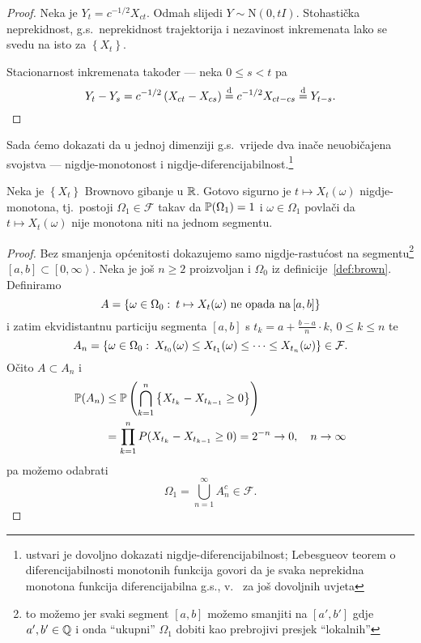 \documentclass[main.tex]{subfiles}
\begin{document}
\begin{proof}
	Neka je \( Y_t = c^{-1/2}X_{ct} \). Odmah slijedi \( Y \sim \mathrm N(0, tI) \). Stohastička neprekidnost, g.s.\ neprekidnost trajektorija i nezavinost
	inkremenata lako se svedu na isto za \( \left\{ X_t \right\} \).

	Stacionarnost inkremenata također --- neka \( 0 \le s < t \) pa \[ Y_t - Y_s = c^{-1/2}\left( X_{ct} - X_{cs} \right) \jpod c^{-1/2}X_{ct-cs} \jpod Y_{t-s}. \]
\end{proof}

Sada ćemo dokazati da u jednoj dimenziji g.s.\ vrijede dva inače neuobičajena svojstva --- nigdje-monotonost i nigdje-diferencijabilnost.\footnote{ustvari je dovoljno dokazati nigdje-diferencijabilnost;
	Lebesgueov teorem o diferencijabilnosti monotonih funkcija govori da je svaka neprekidna monotona funkcija diferencijabilna g.s., v.~\cite[remark~5.10]{sato} za još dovoljnih uvjeta}

\begin{teorem} \label{tm:brown-nemonotonost}
	Neka je \( \left\{ X_t \right\} \) Brownovo gibanje u \( \R \). Gotovo sigurno je \( t \mapsto X_t(\omega) \) nigdje-monotona, tj.\
	postoji \( \Omega_1 \in \mathcal F \) takav da \( \P(\Omega_1)=1 \) i \( \omega \in \Omega_1 \) povlači da \( t \mapsto X_t(\omega) \)
	nije monotona niti na jednom segmentu.
\end{teorem}

\begin{proof}
	Bez smanjenja općenitosti dokazujemo samo nigdje-rastućost na segmentu\footnote{to možemo jer svaki segment \( \left[ a,b \right] \) možemo smanjiti na \( \left[ a',b' \right] \) gdje \( a',b'\in\Q \) i onda \enquote{ukupni} \( \Omega_1 \) dobiti kao prebrojivi presjek \enquote{lokalnih}} \( \left[ a,b \right] \subset \left[ 0,\infty \right\rangle \). Neka je još \( n \ge 2 \) proizvoljan i \( \Omega_0 \) iz definicije~\ref{def:brown}.
	Definiramo
	\begin{equation}
		A = \left\{ \omega \in \Omega_0 \st t \mapsto X_t(\omega) \mathrm{\ ne \ opada \ na } \left[ a,b \right] \right\}
	\end{equation}
	i zatim ekvidistantnu particiju segmenta \( \left[ a,b \right] \) s \( t_k = a + \frac{b-a}n \cdot k \), \( 0 \le k \le n  \) te
	\begin{equation}
		A_n = \left\{ \omega \in \Omega_0 \st X_{t_0}(\omega) \le X_{t_1}(\omega) \le \cdots \le X_{t_n}(\omega) \right\} \in \mathcal F.
	\end{equation}
	Očito \( A \subset A_n \) i
	\begin{align}
		\P(A_n) & \le \P\left(\bigcap_{k=1}^n \left\{ X_{t_k} - X_{t_{k-1}} \ge 0  \right\} \right) \\
		        & = \prod_{k=1}^n P(X_{t_k} - X_{t_{k-1}} \ge 0) = 2^{-n} \un, \quad n \ub
	\end{align}
	pa možemo odabrati
	\[
		\Omega_1 = \bigcup_{n=1}^\infty A_n^c \in \mathcal F.
	\]
\end{proof}
\end{document}
